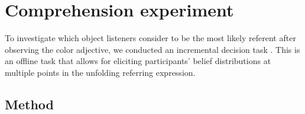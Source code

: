 \documentclass[a4paper,man,floatsintext,natbib]{apa6}
\begin{document}







\section{Comprehension experiment}\label{sec:exp2comp-noprior}

To investigate which object listeners consider to be the most likely referent after observing the color adjective, we conducted an incremental decision task \cite{Qing:2018}. This is an offline task that allows for eliciting participants' belief distributions at multiple points in the unfolding referring expression. 

\subsection{Method}
\end{document}
